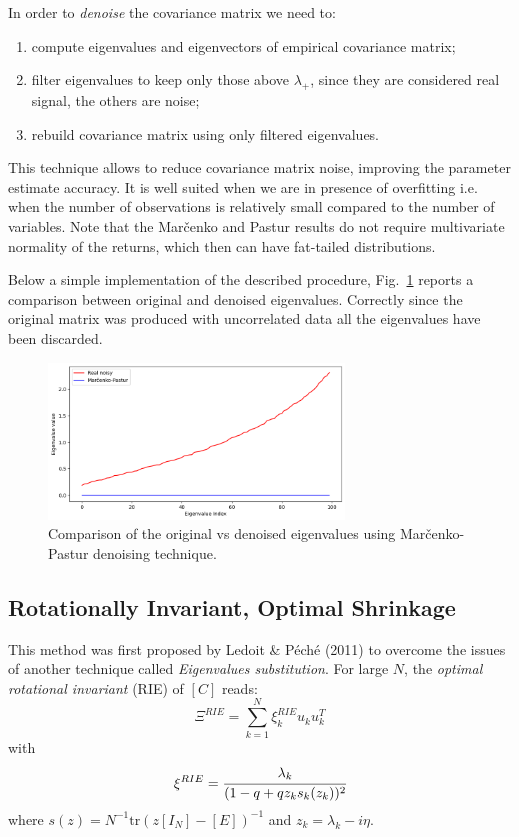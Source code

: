 In order to \emph{denoise} the covariance matrix we need to:
\begin{enumerate}
\item compute eigenvalues and eigenvectors of empirical covariance matrix;
\item filter eigenvalues to keep only those above $\lambda_+$, since they are considered real signal, the others are noise;
\item rebuild covariance matrix using only filtered eigenvalues.
\end{enumerate}

This technique allows to reduce covariance matrix noise, improving the parameter estimate accuracy. It is well suited when we are in presence of overfitting i.e. when the number of observations is relatively small compared to the number of variables.
Note that the Mar\v{c}enko and Pastur results do not require multivariate normality of the returns, which then can have fat-tailed distributions.

Below a simple implementation of the described procedure, Fig.~\ref{fig:marcenko_pastur} reports a comparison between original and denoised eigenvalues. Correctly since the original matrix was produced with uncorrelated data all the eigenvalues have been discarded.


\begin{figure}[htb]
\centering
\includegraphics[width=0.7\textwidth]{figures/marcenko_pastur}
\caption{Comparison of the original vs denoised eigenvalues using Mar\v{c}enko-Pastur denoising technique.}
\label{fig:marcenko_pastur}
\end{figure}

\subsection{Rotationally Invariant, Optimal Shrinkage}
This method was first proposed by Ledoit \& Péché (2011) to overcome the issues of another technique called \emph{Eigenvalues substitution}.
For large $N$, the \emph{optimal rotational invariant} (RIE) of $[C]$ reads:
\begin{equation}
\Xi^{RIE} = \sum_{k=1}^N \xi_k^{RIE}u_k u_k^T
\end{equation}
with 
\begin{equation}
\xi^{RIE} = \cfrac{\lambda_k}{(1-q+qz_ks_k(z_k))^2}
\label{eq:rie_eigenvalues}
\end{equation}
where $s(z)=N^{-1}\text{tr}(z[I_N]-[E])^{-1}$ and $z_k=\lambda_k - i\eta$. 

